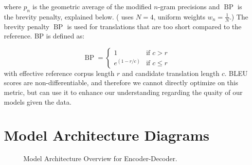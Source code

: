 \documentclass[twoside,twocolumn]{article}
\newlength\mystoreparindent
\newenvironment{myparindent}[1]{%
  \setlength{\mystoreparindent}{\the\parindent}
  \setlength{\parindent}{#1}
  }{%
  \setlength{\parindent}{\mystoreparindent}
}
\begin{document}
\begin{myparindent}{0pt}
\noindent
where $p_n$ is the geometric average of the modified $n$-gram precisions
and $\operatorname{BP}$ is the brevity penalty, explained below.
(\cite{papineni2002bleu} uses $N=4$, uniform weights $w_n = \frac{1}{N}$.)
The brevity penalty $\operatorname{BP}$ is used for translations that are
too short compared to the reference. BP is defined as:

\begin{equation}
  \operatorname{BP} = \begin{cases}
    1 & \text{if } c > r \\
    e^{(1-r/c)} & \text{if } c \leq r
  \end{cases}
\end{equation}
\noindent
with effective reference corpus length $r$ and candidate translation length $c$.
BLEU scores are non-differentiable, and therefore we cannot directly optimize
on this metric, but can use it to enhance our understanding regarding the
quaity of our models given the data.
\newpage
\section{Model Architecture Diagrams}

\begin{figure}[ht]
  \centering
  \caption{Model Architecture Overview for Encoder-Decoder.}
  \label{fig:encoder-decoder}
\end{figure}
\begin{figure}[ht]
  \centering
  \begin{tikzpicture}


\end{tikzpicture}
\end{figure}
\end{myparindent}
\end{document}
